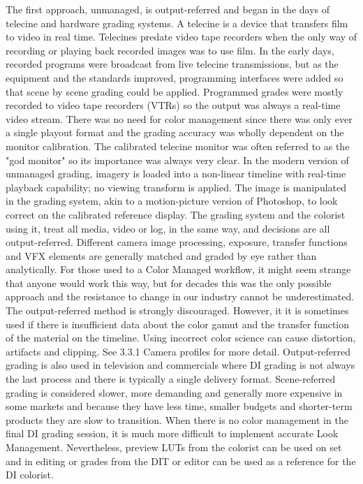The first approach, unmanaged, is output-referred and began in the days of telecine and hardware grading systems. A telecine is a device that transfers film to video in real time. Telecines predate video tape recorders when the only way of recording or playing back recorded images was to use film. In the early days, recorded programs were broadcast from live telecine transmissions, but as the equipment and the standards improved, programming interfaces were added so that scene by scene grading could be applied. Programmed grades were mostly recorded to video tape recorders (VTRs) so the output was always a real-time video stream. There was no need for color management since there was only ever a single playout format and the grading accuracy was wholly dependent on the monitor calibration. The calibrated telecine monitor was often referred to as the "god monitor" so its importance was always very clear. In the modern version of unmanaged grading, imagery is loaded into a non-linear timeline with real-time playback capability; no viewing transform is applied. The image is manipulated in the grading system, akin to a motion-picture version of Photoshop, to look correct on the calibrated reference display. The grading system and the colorist using it, treat all media, video or log, in the same way, and decisions are all output-referred. Different camera image processing, exposure, transfer functions and VFX elements are generally matched and graded by eye rather than analytically. For those used to a Color Managed workflow, it might seem strange that anyone would work this way, but for decades this was the only possible approach and the resistance to change in our industry cannot be underestimated. The output-referred method is strongly discouraged. However, it it is sometimes used if there is insufficient data about the color gamut and the transfer function of the material on the timeline. Using incorrect color science can cause distortion, artifacts and clipping. See 3.3.1 Camera profiles for more detail. Output-referred grading is also used in television and commercials where DI grading is not always the last process and there is typically a single delivery format. Scene-referred grading is considered slower, more demanding and generally more expensive in some markets and because they have less time, smaller budgets and shorter-term products they are slow to transition. When there is no color management in the final DI grading session, it is much more difficult to implement accurate Look Management. Nevertheless, preview LUTs from the colorist can be used on set and in editing or grades from the DIT or editor can be used as a reference for the DI colorist.

